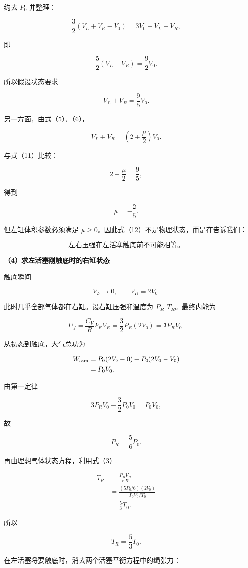 \documentclass[12pt,a4paper,UTF8]{ctexart}
\begin{document}
约去 \(P_0\) 并整理：

\[
\frac32(V_L+V_R-V_0)=3V_0-V_L-V_R,
\]

即

\[
\frac52(V_L+V_R)=\frac92V_0.
\]

所以假设状态要求

\[
V_L+V_R=\frac95V_0.
\tag{11}
\]

另一方面，由式（5）、（6），

\[
V_L+V_R
=\left(2+\frac\mu2\right)V_0.
\]

与式（11）比较：

\[
2+\frac\mu2=\frac95,
\]

得到

\[
\mu=-\frac25.
\tag{12}
\]

但左缸体积参数必须满足
\(\mu\geq0\)。因此式（12）不是物理状态，而是在告诉我们：

\[
\boxed{\text{左右压强在左活塞触底前不可能相等。}}
\tag{13}
\]

\textbf{（4）求左活塞刚触底时的右缸状态}

触底瞬间

\[
V_L\to0,
\qquad
V_R=2V_0.
\tag{14}
\]

此时几乎全部气体都在右缸。设右缸压强和温度为 \(P_R,T_R\)。最终内能为

\[
U_f=\frac{C_V}{R}P_RV_R
=\frac32P_R(2V_0)=3P_RV_0.
\]

从初态到触底，大气总功为

\[
\begin{aligned}
W_{\rm atm}
&=P_0(2V_0-0)-P_0(2V_0-V_0)\\
&=P_0V_0.
\end{aligned}
\]

由第一定律

\[
3P_RV_0-\frac32P_0V_0=P_0V_0,
\]

故

\[
\boxed{P_R=\frac56P_0}.
\tag{15}
\]

再由理想气体状态方程，利用式（3）：

\[
\begin{aligned}
T_R
&=\frac{P_RV_R}{nR}\\
&=\frac{(5P_0/6)(2V_0)}{P_0V_0/T_0}\\
&=\frac53T_0.
\end{aligned}
\]

所以

\[
\boxed{T_R=\frac53T_0}.
\tag{16}
\]

在左活塞将要触底时，消去两个活塞平衡方程中的绳张力：
\end{document}
